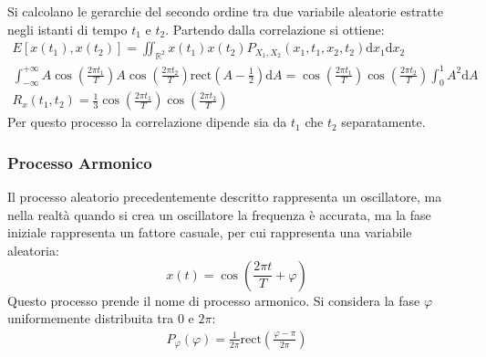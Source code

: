 \documentclass{article}
\newcommand{\rect}{\mathrm{rect}}
\newcommand{\df}{\mathrm{d}}
\numberwithin{equation}{subsection}
\begin{document}
Si calcolano le gerarchie del secondo ordine tra due variabile aleatorie estratte negli istanti di tempo $t_1$ e $t_2$. Partendo dalla correlazione si ottiene:
\begin{gather*}
    E[x(t_1),x(t_2)]=\displaystyle\iint_{\mathbb{R}^2}x(t_1)x(t_2)P_{X_1,X_2}(x_1,t_1,x_2,t_2)\df x_1\df x_2\\    
    \displaystyle\int_{-\infty}^{+\infty}A\cos\left(\frac{2\pi t_1}{T}\right)A\cos\left(\frac{2\pi t_2}{T}\right)\rect\displaystyle\left(A-\frac{1}{2}\right)\df A=\cos\left(\frac{2\pi t_1}{T}\right)\cos\left(\frac{2\pi t_2}{T}\right)\int_0^1A^2\df A\\
    R_{x}(t_1,t_2)=\displaystyle\frac{1}{3}\cos\left(\frac{2\pi t_1}{T}\right)\cos\left(\frac{2\pi t_2}{T}\right)
\end{gather*}
Per questo processo la correlazione dipende sia da $t_1$ che $t_2$ separatamente. 

\subsubsection{Processo Armonico}

Il processo aleatorio precedentemente descritto rappresenta un oscillatore, ma nella realtà quando si crea un oscillatore la frequenza è accurata, ma la fase iniziale rappresenta un fattore casuale,
per cui rappresenta una variabile aleatoria: 
\begin{equation*}
    x(t)=\displaystyle\cos\left(\frac{2\pi t}{T}+\varphi\right)
\end{equation*}
Questo processo prende il nome di processo armonico. Si considera la fase $\varphi$ uniformemente distribuita tra $0$ e $2\pi$:
\begin{gather*}
    P_{\varphi}(\varphi)=\displaystyle\frac{1}{2\pi}\rect\left(\frac{\varphi-\pi}{2\pi}\right)
\end{gather*}
\end{document}
